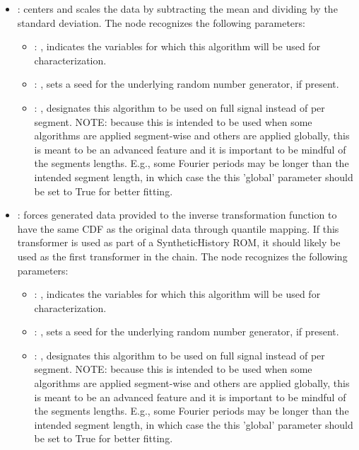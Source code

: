 \begin{itemize}
    \item {}:
      centers and scales the data by subtracting the mean and dividing by     the standard
      deviation.
      The  node recognizes the following parameters:
        \begin{itemize}
          \item {}: ,
            indicates the variables for which this algorithm will be used for characterization.
          \item {}: ,
            sets a seed for the underlying random number generator, if present.
          \item {}: ,
            designates this algorithm to be used on full signal instead of per
            segment. NOTE: because this is intended to be used when some algorithms are
            applied segment-wise and others are applied globally, this is meant to be an
            advanced feature and it is important to be mindful of the segments lengths.
            E.g., some Fourier periods may be longer than the intended segment length, in
            which case the this 'global' parameter should be set to True for better
            fitting. 
      \end{itemize}

    \item {}:
      forces generated data provided to the inverse transformation function to
      have the same CDF as the original data through quantile mapping. If this
      transformer is used as part of a SyntheticHistory ROM, it should likely
      be used as the first transformer in the chain.
      The  node recognizes the following parameters:
        \begin{itemize}
          \item {}: ,
            indicates the variables for which this algorithm will be used for characterization.
          \item {}: ,
            sets a seed for the underlying random number generator, if present.
          \item {}: ,
            designates this algorithm to be used on full signal instead of per
            segment. NOTE: because this is intended to be used when some algorithms are
            applied segment-wise and others are applied globally, this is meant to be an
            advanced feature and it is important to be mindful of the segments lengths.
            E.g., some Fourier periods may be longer than the intended segment length, in
            which case the this 'global' parameter should be set to True for better
            fitting. 
      \end{itemize}


\end{itemize}
